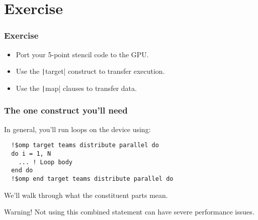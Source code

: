 \documentclass[aspectratio=169]{beamer}
\begin{document}
\section{Exercise}
\begin{frame}
\frametitle{Exercise}
\begin{itemize}
  \item Port your 5-point stencil code to the GPU.
  \item Use the \texttt|target| construct to transfer execution.
  \item Use the \texttt|map| clauses to transfer data.
\end{itemize}
\end{frame}


\begin{frame}[fragile]
  \frametitle{The one construct you'll need}
  In general, you'll run loops on the device using:
  \begin{verbatim}
  !$omp target teams distribute parallel do
  do i = 1, N
    ... ! Loop body
  end do
  !$omp end target teams distribute parallel do
  \end{verbatim}
  
  \vfill
  
  We'll walk through what the constituent parts mean.
  
  \vfill
  
  \begin{alertblock}{Warning!}
  Not using this combined statement can have severe performance issues.
  \end{alertblock}
  \end{frame}
  
\end{document}
